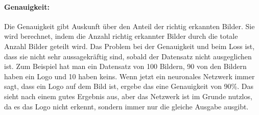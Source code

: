 \documentclass[12pt,a4paper]{report}
\begin{document}
\paragraph{Genauigkeit:} Die Genauigkeit gibt Auskunft über den Anteil der richtig erkannten Bilder.
Sie wird berechnet, indem die Anzahl richtig erkannter Bilder durch die totale Anzahl Bilder geteilt wird.
Das Problem bei der Genauigkeit und beim Loss ist, dass sie nicht sehr aussagekräftig sind,
sobald der Datensatz nicht ausgeglichen ist.
Zum Beispiel hat man ein Datensatz von 100 Bildern, 90 von den Bildern haben ein Logo und 10 haben keins.
Wenn jetzt ein neuronales Netzwerk immer sagt, dass ein Logo auf dem Bild ist, ergebe das eine Genauigkeit von 90\%.
Das sieht nach einem gutes Ergebnis aus, aber das Netzwerk ist im Grunde nutzlos, da es das Logo nicht erkennt,
sondern immer nur die gleiche Ausgabe ausgibt.
\end{document}
